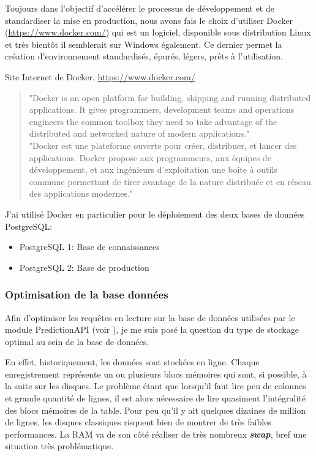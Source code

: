 Toujours dans l'objectif d'accélérer le processus de développement et de standardiser la mise en production, nous avons fais le choix d'utiliser Docker (\url{https://www.docker.com/}) qui est un logiciel, disponible sous distribution Linux et très bientôt il semblerait sur Windows également. Ce dernier permet la création d'environnement standardisés, épurés, légers, prêts à l'utilisation.


\begin{chapquote}
{Site Internet de Docker, \url{https://www.docker.com/}}
\begin{verse}
"Docker is an open platform for building, shipping and running distributed applications. It gives programmers, development teams and operations engineers the common toolbox they need to take advantage of the distributed and networked nature of modern applications."\\
\vspace{3mm}
"Docker est une plateforme ouverte pour créer, distribuer, et lancer des applications. Docker propose aux programmeurs, aux équipes de développement, et aux ingénieurs d'exploitation une boite à outils commune permettant de tirer avantage de la nature distribuée et en réseau des applications modernes."
\end{verse}
\end{chapquote}

J'ai utilisé Docker en particulier pour le déploiement des deux bases de données PostgreSQL:
\begin{itemize}
	\item PostgreSQL 1: Base de connaissances
	\item PostgreSQL 2: Base de production
\end{itemize}
\vspace{3mm}

\subsubsection{Optimisation de la base données}

Afin d'optimiser les requêtes en lecture sur la base de données utilisées par le module PredictionAPI (voir ), je me suis posé la question du type de stockage optimal au sein de la base de données.

En effet, historiquement, les données sont stockées en ligne. Chaque enregistrement représente un ou plusieurs blocs mémoires qui sont, si possible, à la suite sur les disques. Le problème étant que lorsqu'il faut lire peu de colonnes et grande quantité de lignes, il est alors nécessaire de lire quasiment l'intégralité des blocs mémoires de la table. Pour peu qu'il y ait quelques dizaines de million de lignes, les disques classiques risquent bien de montrer de très faibles performances. La RAM va de son côté réaliser de très nombreux \textbf{\textit{swap}}, bref une situation très problématique.

